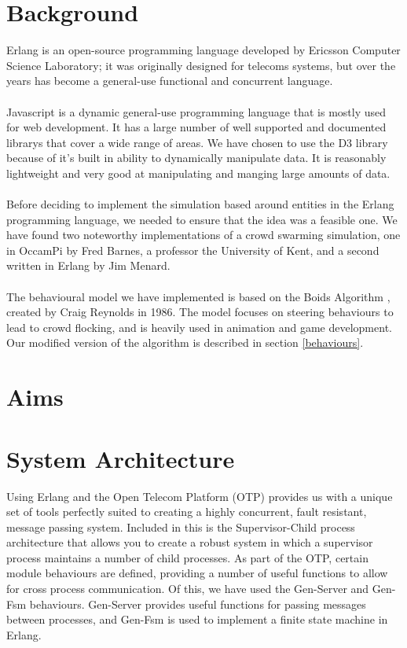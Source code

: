 \documentclass[10pt, a4paper, conference, compsocconf]{IEEEtran}
\begin{document}
\section{Background \label{background}}
Erlang is an open-source programming language developed by Ericsson Computer Science Laboratory; it was originally designed for telecoms systems, but over the years has become a general-use functional and concurrent language.\\
\\
Javascript is a dynamic general-use programming language that is mostly used for web development. It has a large number of well supported and documented librarys that cover a wide range of areas. We have chosen to use the D3\cite{d3} library because of it's built in ability to dynamically manipulate data. It is reasonably lightweight and very good at manipulating and manging large amounts of data.\\
\\
Before deciding to implement the simulation based around entities in the Erlang programming language, we needed to ensure that the idea was a feasible one. We have found two noteworthy implementations of a crowd swarming simulation, one in OccamPi by Fred Barnes\cite{occam_boids}, a professor the University of Kent, and a second written in Erlang by Jim Menard\cite{erlang_boids}.\\
\\
The behavioural model we have implemented is based on the Boids Algorithm \cite{boids}, created by Craig Reynolds in 1986. The model focuses on steering behaviours to lead to crowd flocking, and is heavily used in animation and game development. Our modified version of the algorithm is described in section \ref{behaviours}.

\section{Aims \label{aims}}

\section{System Architecture \label{architecture}}

Using Erlang and the Open Telecom Platform\cite{otp} (OTP) provides us with a unique set of tools perfectly suited to creating a highly concurrent, fault resistant, message passing system. Included in this is the Supervisor-Child process architecture that allows you to create a robust system in which a supervisor process maintains a number of child processes. As part of the OTP, certain module behaviours are defined, providing a number of useful functions to allow for cross process communication. Of this, we have used the Gen-Server and Gen-Fsm behaviours. Gen-Server provides useful functions for passing messages between processes, and Gen-Fsm is used to implement a finite state machine in Erlang.
\end{document}
